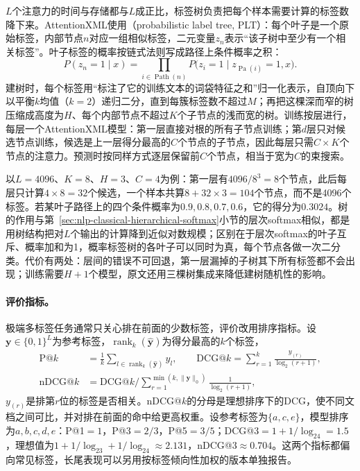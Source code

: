 $L$个注意力的时间与存储都与$L$成正比，标签树负责把每个样本需要计算的标签数降下来。AttentionXML使用（probabilistic label tree, PLT）：每个叶子是一个原始标签，内部节点$n$对应一组相似标签，二元变量$z_n$表示“该子树中至少有一个相关标签”。叶子标签的概率按链式法则写成路径上条件概率之积：
\[
  P(z_n=1\mid x)=\prod_{i\in\operatorname{Path}(n)}P\bigl(z_i=1\mid z_{\operatorname{Pa}(i)}=1,x\bigr).
\]
建树时，每个标签用“标注了它的训练文本的词袋特征之和”归一化表示，自顶向下以平衡$k$均值（$k=2$）递归二分，直到每簇标签数不超过$M$；再把这棵深而窄的树压缩成高度为$H$、每个内部节点不超过$K$个子节点的浅而宽的树。训练按层进行，每层一个AttentionXML模型：第一层直接对根的所有子节点训练；第$d$层只对候选节点训练，候选是上一层得分最高的$C$个节点的子节点，因此每层只需$C\times K$个节点的注意力。预测时按同样方式逐层保留前$C$个节点，相当于宽为$C$的束搜索。

以$L=4096$、$K=8$、$H=3$、$C=4$为例：第一层有$4096/8^3=8$个节点，此后每层只计算$4\times8=32$个候选，一个样本共算$8+32\times3=104$个节点，而不是4096个标签。若某叶子路径上的四个条件概率为$0.9,0.8,0.7,0.6$，它的得分为$0.3024$。树的作用与第~\ref{sec:nlp-classical-hierarchical-softmax}小节的层次softmax相似，都是用树结构把对$L$个输出的计算降到近似对数规模；区别在于层次softmax的叶子互斥、概率加和为1，概率标签树的各叶子可以同时为真，每个节点各做一次二分类。代价有两处：层间的错误不可回退，第一层漏掉的子树其下所有标签都不会出现；训练需要$H+1$个模型，原文还用三棵树集成来降低建树随机性的影响。

\paragraph{评价指标。}极端多标签任务通常只关心排在前面的少数标签，评价改用排序指标。设$\bm y\in\{0,1\}^L$为参考标签，$\operatorname{rank}_k(\hat{\bm y})$为得分最高的$k$个标签，
\begin{equation}
  \label{eq:nlp-classification-xml-metrics}
  \begin{aligned}
    \mathrm{P@}k&=\frac1k\sum_{l\in\operatorname{rank}_k(\hat{\bm y})}y_l,\qquad
    \mathrm{DCG@}k=\sum_{r=1}^{k}\frac{y_{(r)}}{\log_2(r+1)},\\
    \mathrm{nDCG@}k&=\mathrm{DCG@}k\Big/\sum_{r=1}^{\min(k,\lVert\bm y\rVert_0)}\frac{1}{\log_2(r+1)},
  \end{aligned}
\end{equation}
$y_{(r)}$是排第$r$位的标签是否相关。nDCG@$k$的分母是理想排序下的DCG，使不同文档之间可比，并对排在前面的命中给更高权重。设参考标签为$\{a,c,e\}$，模型排序为$a,b,c,d,e$：P@1$=1$，P@3$=2/3$，P@5$=3/5$；DCG@3$=1+1/\log_24=1.5$，理想值为$1+1/\log_23+1/\log_24\approx2.131$，nDCG@3$\approx0.704$。这两个指标都偏向常见标签，长尾表现可以另用按标签倾向性加权的版本单独报告。


